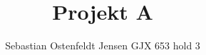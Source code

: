 \documentclass[12pt]{article}
\title{Projekt A}
\author{Sebastian Ostenfeldt Jensen
		GJX 653
		hold 3}
\begin{document}
\newcommand{\Eone}{
\left(\begin{array}{ccc}
1&0&0
\\
-4&1&0
\\
0&0&1
\end{array}\right)
  }
  
\newcommand{\Etwo}{  
\left(\begin{array}{ccc}
1&0&0
\\
0&0&1
\\
0&1&0
\end{array}\right)
}

\newcommand{\Ethree}{
\left(\begin{array}{ccc}
1&0&0
\\
0&1&0
\\
0&0&1/5
\end{array}\right)
}

\newcommand{\Efour}{
\left(\begin{array}{ccc}
1&0&1
\\
0&1&0
\\
0&0&1
\end{array}\right)
}

\newcommand{\fourXthree}{
\left(\begin{array}{ccc}
1&0&1/5
\\
0&1&0
\\
0&0&1/5
\end{array}\right)
  }
  
\newcommand{\fourXthreeXtwo}{
\left(\begin{array}{ccc}
1&1/5&0
\\
0&0&1
\\
0&1/5&0
\end{array}\right)
  }  
  
\newcommand{\fourXthreeXtwoXone}{
\left(\begin{array}{ccc}
1/5&1/5&0
\\
0&0&1
\\
-4/5&1/5&0
\end{array}\right)
  }  

\newcommand{\fiveXfourXthreeXtwoXone}{
\left(\begin{array}{ccc}
1&1&0
\\
0&0&1
\\
-4&1&0
\end{array}\right)
  }  
  
\maketitle
\newpage
\end{document}
